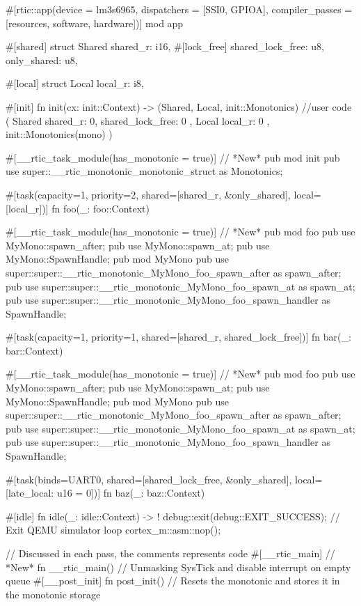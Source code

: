#[rtic::app(device = lm3s6965, dispatchers = [SSI0, GPIOA], compiler_passes = [resources, software, hardware])]
mod app {
    #[shared]
    struct Shared {
        shared_r: i16,
        #[lock_free]
        shared_lock_free: u8,
        only_shared: u8,
    }

    #[local]
    struct Local {
        local_r: i8,
    }

    #[init]
    fn init(cx: init::Context) -> (Shared, Local, init::Monotonics) {
        //user code
        (
            Shared { shared_r: 0, shared_lock_free: 0 }, 
            Local { local_r: 0 }, 
            init::Monotonics(mono)
        )
    }

    #[__rtic_task_module(has_monotonic = true)] // *New*
    pub mod init {
        pub use super::__rtic_monotonic_monotonic_struct as Monotonics;
    }

    #[task(capacity=1, priority=2, shared=[shared_r, &only_shared], local=[local_r])]
    fn foo(_: foo::Context) {
    }
    
    #[__rtic_task_module(has_monotonic = true)] // *New*
    pub mod foo {
        pub use MyMono::spawn_after;
        pub use MyMono::spawn_at;
        pub use MyMono::SpawnHandle;
        pub mod MyMono {
            pub use super::super::__rtic_monotonic_MyMono_foo_spawn_after as spawn_after;
            pub use super::super::__rtic_monotonic_MyMono_foo_spawn_at as spawn_at;
            pub use super::super::__rtic_monotonic_MyMono_foo_spawn_handler as SpawnHandle;
        }
    }

    #[task(capacity=1, priority=1, shared=[shared_r, shared_lock_free])]
    fn bar(_: bar::Context) {
    }
    
    #[__rtic_task_module(has_monotonic = true)] // *New*
    pub mod foo {
        pub use MyMono::spawn_after;
        pub use MyMono::spawn_at;
        pub use MyMono::SpawnHandle;
        pub mod MyMono {
            pub use super::super::__rtic_monotonic_MyMono_foo_spawn_after as spawn_after;
            pub use super::super::__rtic_monotonic_MyMono_foo_spawn_at as spawn_at;
            pub use super::super::__rtic_monotonic_MyMono_foo_spawn_handler as SpawnHandle;
        }
    }

    #[task(binds=UART0, shared=[shared_lock_free, &only_shared], local=[late_local: u16 = 0])]
    fn baz(_: baz::Context){
    }

    #[idle]
    fn idle(_: idle::Context) -> ! {
        debug::exit(debug::EXIT_SUCCESS); // Exit QEMU simulator
        loop {
            cortex_m::asm::nop();
        }
    }

    // Discussed in each pass, the comments represents code
    #[__rtic_main] // *New*
    fn __rtic_main() {
        // Unmasking SysTick and disable interrupt on empty queue
        #[__post_init]
        fn post_init() {
            // Resets the monotonic and stores it in the monotonic storage
        }
    }
}